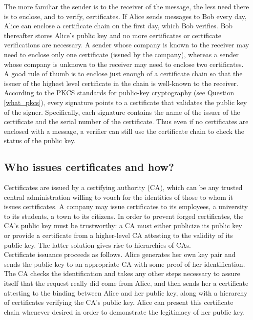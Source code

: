 The more familiar the sender is to the receiver of the message, the
less need there is to enclose, and to verify, certificates. If Alice
sends messages to Bob every day, Alice can enclose a certificate chain
on the first day, which Bob verifies. Bob thereafter stores Alice's
public key and no more certificates or certificate verifications are
necessary. A sender whose company is known to the receiver may need to
enclose only one certificate (issued by the company), whereas a sender
whose company is unknown to the receiver may need to enclose two
certificates. A good rule of thumb is to enclose just enough of a
certificate chain so that the issuer of the highest level certificate
in the chain is well-known to the receiver.\\

According to the PKCS standards for public-key cryptography (see Question
\ref{what_pkcs}), every signature points to a certificate that validates
the public key of the signer. Specifically, each signature contains the
name of the issuer of the certificate and the serial number of the
certificate. Thus even if no certificates are enclosed with a message, a
verifier can still use the certificate chain to check the status of the
public key.

\subsection{Who issues certificates and how?}
\label{who_cert}

Certificates are issued by a certifying authority (CA), which can be
any trusted central administration willing to vouch for the identities
of those to whom it issues certificates. A company may issue
certificates to its employees, a university to its students, a town to
its citizens. In order to prevent forged certificates, the CA's public
key must be trustworthy: a CA must either publicize its public key or
provide a certificate from a higher-level CA attesting to the validity
of its public key. The latter solution gives rise to hierarchies of CAs.\\

Certificate issuance proceeds as follows. Alice generates her own key
pair and sends the public key to an appropriate CA with some proof of
her identification. The CA checks the identification and takes any
other steps necessary to assure itself that the request really did come
from Alice, and then sends her a certificate attesting to the binding
between Alice and her public key, along with a hierarchy of
certificates verifying the CA's public key. Alice can present this
certificate chain whenever desired in order to demonstrate the
legitimacy of her public key.\\

